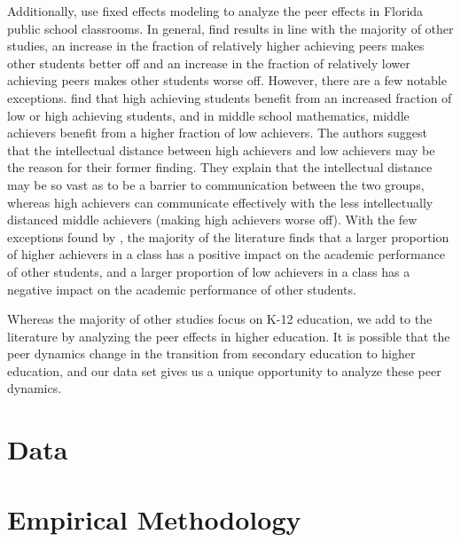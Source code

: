 \documentclass[12pt,letterpaper,english,fleqn]{article}
\newcommand{\sectlabel}[1]{section~\ref{#1} (\nameref{#1})}
\begin{document}
Additionally, \citet{burke2013classroom} use fixed effects modeling to analyze the peer effects in Florida public school classrooms.
In general, \citet{burke2013classroom} find results in line with the majority of other studies, an increase in the fraction of relatively higher achieving peers makes other students better off and an increase in the fraction of relatively lower achieving peers makes other students worse off.
However, there are a few notable exceptions.
\citet{burke2013classroom} find that high achieving students benefit from an increased fraction of low or high achieving students, and in middle school mathematics, middle achievers benefit from a higher fraction of low achievers.
The authors suggest that the intellectual distance between high achievers and low achievers may be the reason for their former finding.
They explain that the intellectual distance may be so vast as to be a barrier to communication between the two groups, whereas high achievers can communicate effectively with the less intellectually distanced middle achievers (making high achievers worse off). 
With the few exceptions found by \citet{burke2013classroom}, the majority of the literature finds that a larger proportion of higher achievers in a class has a positive impact on the academic performance of other students, and a larger proportion of low achievers in a class has a negative impact on the academic performance of other students.%

Whereas the majority of other studies focus on K-12 education, we add to the literature by analyzing the peer effects in higher education. 
It is possible that the peer dynamics change in the transition from secondary education to higher education, and our data set gives us a unique opportunity to analyze these peer dynamics.

\section{Data}\label{data}



\section{Empirical Methodology}\label{methods}
\end{document}
